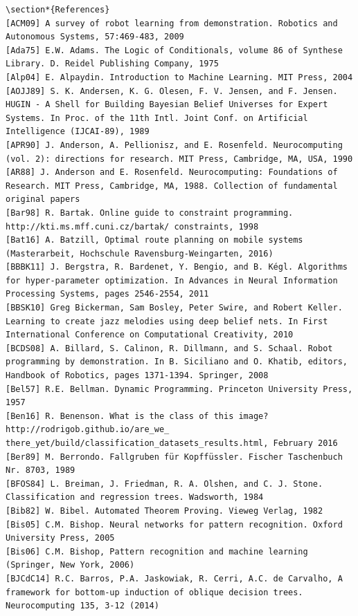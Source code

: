\documentclass[10pt]{book}
\begin{document}
\begin{center}
\begin{enumerate}
\begin{center}
\begin{center}
\begin{center}
\begin{center}
\begin{center}
\begin{verbatim}
\section*{References}
[ACM09] A survey of robot learning from demonstration. Robotics and Autonomous Systems, 57:469-483, 2009
[Ada75] E.W. Adams. The Logic of Conditionals, volume 86 of Synthese Library. D. Reidel Publishing Company, 1975
[Alp04] E. Alpaydin. Introduction to Machine Learning. MIT Press, 2004
[AOJJ89] S. K. Andersen, K. G. Olesen, F. V. Jensen, and F. Jensen. HUGIN - A Shell for Building Bayesian Belief Universes for Expert Systems. In Proc. of the 11th Intl. Joint Conf. on Artificial Intelligence (IJCAI-89), 1989
[APR90] J. Anderson, A. Pellionisz, and E. Rosenfeld. Neurocomputing (vol. 2): directions for research. MIT Press, Cambridge, MA, USA, 1990
[AR88] J. Anderson and E. Rosenfeld. Neurocomputing: Foundations of Research. MIT Press, Cambridge, MA, 1988. Collection of fundamental original papers
[Bar98] R. Bartak. Online guide to constraint programming. http://kti.ms.mff.cuni.cz/bartak/ constraints, 1998
[Bat16] A. Batzill, Optimal route planning on mobile systems (Masterarbeit, Hochschule Ravensburg-Weingarten, 2016)
[BBBK11] J. Bergstra, R. Bardenet, Y. Bengio, and B. Kégl. Algorithms for hyper-parameter optimization. In Advances in Neural Information Processing Systems, pages 2546-2554, 2011
[BBSK10] Greg Bickerman, Sam Bosley, Peter Swire, and Robert Keller. Learning to create jazz melodies using deep belief nets. In First International Conference on Computational Creativity, 2010
[BCDS08] A. Billard, S. Calinon, R. Dillmann, and S. Schaal. Robot programming by demonstration. In B. Siciliano and O. Khatib, editors, Handbook of Robotics, pages 1371-1394. Springer, 2008
[Bel57] R.E. Bellman. Dynamic Programming. Princeton University Press, 1957
[Ben16] R. Benenson. What is the class of this image? http://rodrigob.github.io/are_we_ there_yet/build/classification_datasets_results.html, February 2016
[Ber89] M. Berrondo. Fallgruben für Kopffüssler. Fischer Taschenbuch Nr. 8703, 1989
[BFOS84] L. Breiman, J. Friedman, R. A. Olshen, and C. J. Stone. Classification and regression trees. Wadsworth, 1984
[Bib82] W. Bibel. Automated Theorem Proving. Vieweg Verlag, 1982
[Bis05] C.M. Bishop. Neural networks for pattern recognition. Oxford University Press, 2005
[Bis06] C.M. Bishop, Pattern recognition and machine learning (Springer, New York, 2006)
[BJCdC14] R.C. Barros, P.A. Jaskowiak, R. Cerri, A.C. de Carvalho, A framework for bottom-up induction of oblique decision trees. Neurocomputing 135, 3-12 (2014)

\end{verbatim}
\end{center}
\end{center}
\end{center}
\end{center}
\end{center}
\end{enumerate}
\end{center}
\end{document}
